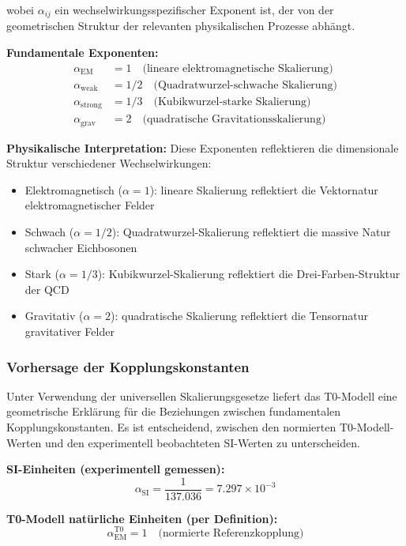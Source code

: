 \documentclass[12pt,a4paper]{article}
\begin{document}
	wobei $\alpha_{ij}$ ein wechselwirkungsspezifischer Exponent ist, der von der geometrischen Struktur der relevanten physikalischen Prozesse abhängt.
	
	\textbf{Fundamentale Exponenten:}
	\begin{align}
		\alpha_{\text{EM}} &= 1 \quad \text{(lineare elektromagnetische Skalierung)} \\
		\alpha_{\text{weak}} &= 1/2 \quad \text{(Quadratwurzel-schwache Skalierung)} \\
		\alpha_{\text{strong}} &= 1/3 \quad \text{(Kubikwurzel-starke Skalierung)} \\
		\alpha_{\text{grav}} &= 2 \quad \text{(quadratische Gravitationsskalierung)}
	\end{align}
	
	\textbf{Physikalische Interpretation:} Diese Exponenten reflektieren die dimensionale Struktur verschiedener Wechselwirkungen:
	\begin{itemize}
		\item Elektromagnetisch ($\alpha = 1$): lineare Skalierung reflektiert die Vektornatur elektromagnetischer Felder
		\item Schwach ($\alpha = 1/2$): Quadratwurzel-Skalierung reflektiert die massive Natur schwacher Eichbosonen
		\item Stark ($\alpha = 1/3$): Kubikwurzel-Skalierung reflektiert die Drei-Farben-Struktur der QCD
		\item Gravitativ ($\alpha = 2$): quadratische Skalierung reflektiert die Tensornatur gravitativer Felder
	\end{itemize}
	
	\subsubsection{Vorhersage der Kopplungskonstanten}
	
	Unter Verwendung der universellen Skalierungsgesetze liefert das T0-Modell eine geometrische Erklärung für die Beziehungen zwischen fundamentalen Kopplungskonstanten. Es ist entscheidend, zwischen den normierten T0-Modell-Werten und den experimentell beobachteten SI-Werten zu unterscheiden.
	
	\textbf{SI-Einheiten (experimentell gemessen):}
	\begin{equation}
		\alpha_{\text{SI}} = \frac{1}{137.036} = 7.297 \times 10^{-3}
	\end{equation}
	
	\textbf{T0-Modell natürliche Einheiten (per Definition):}
	\begin{equation}
		\alpha_{\text{EM}}^{\text{T0}} = 1 \quad \text{(normierte Referenzkopplung)}
	\end{equation}
	
\end{document}
